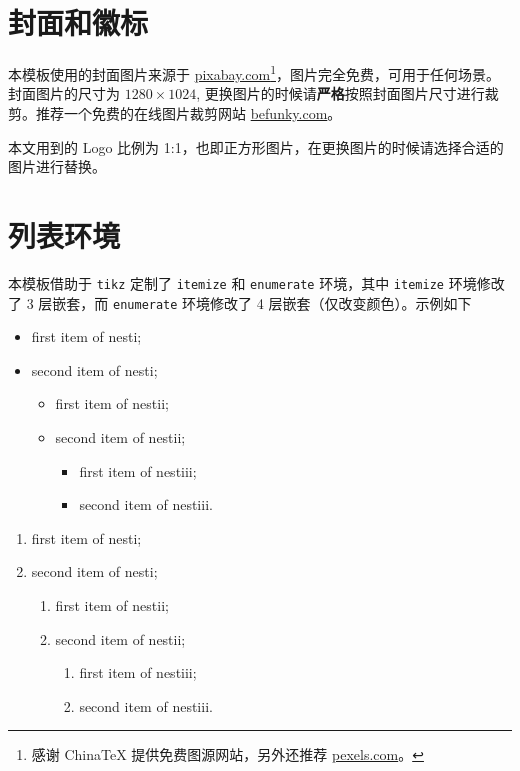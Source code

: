 	\section{封面和徽标}
	
	本模板使用的封面图片来源于 \href{https://pixabay.com/en/tea-time-poetry-coffee-reading-3240766/}{pixabay.com}\footnote{感谢 China\TeX{} 提供免费图源网站，另外还推荐 \href{https://www.pexels.com/}{pexels.com}。}，图片完全免费，可用于任何场景。封面图片的尺寸为 $1280 \times 1024$, 更换图片的时候请\textbf{严格}按照封面图片尺寸进行裁剪。推荐一个免费的在线图片裁剪网站 \href{https://www.befunky.com/create/crop-photo/}{befunky.com}。
	
	本文用到的 Logo 比例为 1:1，也即正方形图片，在更换图片的时候请选择合适的图片进行替换。
	
	\section{列表环境}
	本模板借助于 \lstinline{tikz} 定制了 \lstinline{itemize} 和 \lstinline{enumerate} 环境，其中 \lstinline{itemize} 环境修改了 3 层嵌套，而 \lstinline{enumerate} 环境修改了 4 层嵌套（仅改变颜色）。示例如下\\[2ex]
	\begin{minipage}[b]{0.49\textwidth}
	\begin{itemize}
 \item first item of nesti;
 \item second item of nesti;
 \begin{itemize}
    \item first item of nestii;
    \item second item of nestii;
    \begin{itemize}
       \item first item of nestiii;
       \item second item of nestiii.
    \end{itemize}   
 \end{itemize}
	\end{itemize}
	\end{minipage}
	\begin{minipage}[b]{0.49\textwidth}
	\begin{enumerate}
 \item first item of nesti;
 \item second item of nesti;
 \begin{enumerate}
    \item first item of nestii;
    \item second item of nestii;
    \begin{enumerate}
       \item first item of nestiii;
       \item second item of nestiii.
    \end{enumerate}   
 \end{enumerate}
	\end{enumerate}
	\end{minipage}
	
